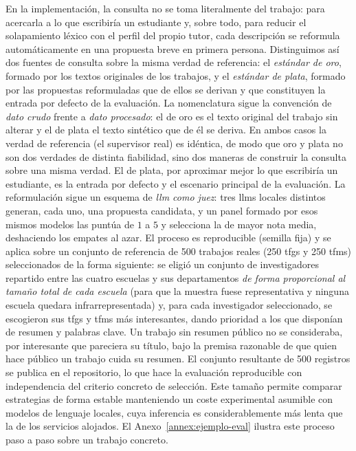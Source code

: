 En la implementación, la consulta no se toma literalmente del trabajo: para acercarla a lo que escribiría un estudiante y, sobre todo, para reducir el solapamiento léxico con el perfil del propio tutor, cada descripción se reformula automáticamente en una propuesta breve en primera persona.
Distinguimos así dos fuentes de consulta sobre la misma verdad de referencia: el \emph{estándar de oro}, formado por los textos originales de los trabajos, y el \emph{estándar de plata}, formado por las propuestas reformuladas que de ellos se derivan y que constituyen la entrada por defecto de la evaluación.
La nomenclatura sigue la convención de \emph{dato crudo} frente a \emph{dato procesado}: el de oro es el texto original del trabajo sin alterar y el de plata el texto sintético que de él se deriva. En ambos casos la verdad de referencia (el supervisor real) es idéntica, de modo que oro y plata no son dos verdades de distinta fiabilidad, sino dos maneras de construir la consulta sobre una misma verdad.
El de plata, por aproximar mejor lo que escribiría un estudiante, es la entrada por defecto y el escenario principal de la evaluación.
La reformulación sigue un esquema de \emph{\gls{llm} como juez}: tres \glspl{llm} locales distintos generan, cada uno, una propuesta candidata, y un panel formado por esos mismos modelos las puntúa de $1$ a $5$ y selecciona la de mayor nota media, deshaciendo los empates al azar.
El proceso es reproducible (semilla fija) y se aplica sobre un conjunto de referencia de 500 trabajos reales (250 \glspl{tfg} y 250 \glspl{tfm}) seleccionados de la forma siguiente: se eligió un conjunto de investigadores repartido entre las cuatro escuelas y sus departamentos \emph{de forma proporcional al tamaño total de cada escuela} (para que la muestra fuese representativa y ninguna escuela quedara infrarrepresentada) y, para cada investigador seleccionado, se escogieron sus \glspl{tfg} y \glspl{tfm} más interesantes, dando prioridad a los que disponían de resumen y palabras clave.
Un trabajo sin resumen público no se consideraba, por interesante que pareciera su título, bajo la premisa razonable de que quien hace público un trabajo cuida su resumen.
El conjunto resultante de 500 registros se publica en el repositorio, lo que hace la evaluación reproducible con independencia del criterio concreto de selección.
Este tamaño permite comparar estrategias de forma estable manteniendo un coste experimental asumible con modelos de lenguaje locales, cuya inferencia es considerablemente más lenta que la de los servicios alojados.
El Anexo~\ref{annex:ejemplo-eval} ilustra este proceso paso a paso sobre un trabajo concreto.

